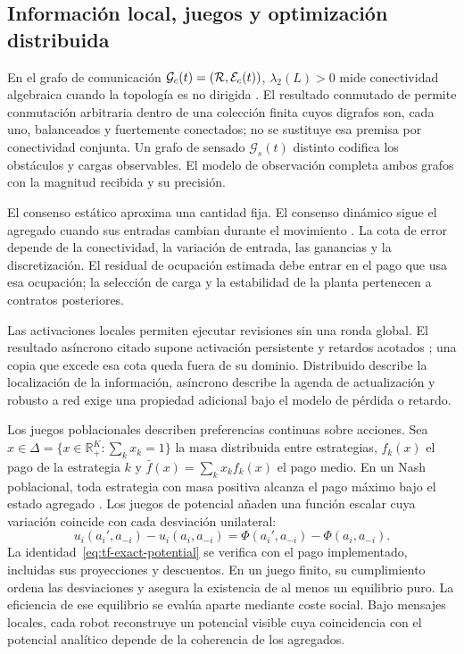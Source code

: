 \subsection{Información local, juegos y optimización distribuida}
\label{subsec:tf-games-consensus}

En el grafo de comunicación \(\mathcal G_c(t)=(\mathcal{R},\mathcal E_c(t))\), \(\lambda_2(L)>0\) mide conectividad algebraica cuando la topología es no dirigida \parencite{bullo2009distributed}. El resultado conmutado de \textcite{olfatiSaber2004switchingConsensus} permite conmutación arbitraria dentro de una colección finita cuyos digrafos son, cada uno, balanceados y fuertemente conectados; no se sustituye esa premisa por conectividad conjunta. Un grafo de sensado \(\mathcal G_s(t)\) distinto codifica los obstáculos y cargas observables. El modelo de observación completa ambos grafos con la magnitud recibida y su precisión.

El consenso estático aproxima una cantidad fija. El consenso dinámico sigue el agregado cuando sus entradas cambian durante el movimiento \parencite{kia2019dynamicConsensus}. La cota de error depende de la conectividad, la variación de entrada, las ganancias y la discretización. El residual de ocupación estimada debe entrar en el pago que usa esa ocupación; la selección de carga y la estabilidad de la planta pertenecen a contratos posteriores.

Las activaciones locales permiten ejecutar revisiones sin una ronda global. El resultado asíncrono citado supone activación persistente y retardos acotados \parencite{tsitsiklis1986asynchronousOptimization}; una copia que excede esa cota queda fuera de su dominio. Distribuido describe la localización de la información, asíncrono describe la agenda de actualización y robusto a red exige una propiedad adicional bajo el modelo de pérdida o retardo.

Los juegos poblacionales describen preferencias continuas sobre acciones. Sea $x\in\Delta=\{x\in\mathbb R_+^K:\sum_kx_k=1\}$ la masa distribuida entre estrategias, $f_k(x)$ el pago de la estrategia $k$ y $\bar f(x)=\sum_kx_kf_k(x)$ el pago medio. En un Nash poblacional, toda estrategia con masa positiva alcanza el pago máximo bajo el estado agregado \parencite{sandholm2010population}. Los juegos de potencial añaden una función escalar cuya variación coincide con cada desviación unilateral:
\begin{equation}
  u_i(a_i',a_{-i})-u_i(a_i,a_{-i})
  =\Phi(a_i',a_{-i})-\Phi(a_i,a_{-i}).
  \label{eq:tf-exact-potential}
\end{equation}
La identidad~\eqref{eq:tf-exact-potential} se verifica con el pago implementado, incluidas sus proyecciones y descuentos. En un juego finito, su cumplimiento ordena las desviaciones y asegura la existencia de al menos un equilibrio puro. La eficiencia de ese equilibrio se evalúa aparte mediante coste social. Bajo mensajes locales, cada robot reconstruye un potencial visible cuya coincidencia con el potencial analítico depende de la coherencia de los agregados.

